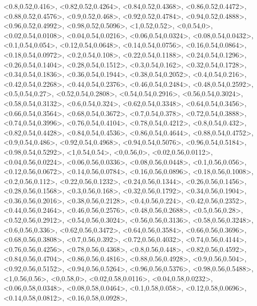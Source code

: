 \documentclass[a4paper,10pt]{article}
\begin{document}
\begin{eulernotebook}
\begin{euleroutput}
  <0.8,0.52,0.416>,
  <0.82,0.52,0.4264>,
  <0.84,0.52,0.4368>,
  <0.86,0.52,0.4472>,
  <0.88,0.52,0.4576>,
  <0.9,0.52,0.468>,
  <0.92,0.52,0.4784>,
  <0.94,0.52,0.4888>,
  <0.96,0.52,0.4992>,
  <0.98,0.52,0.5096>,
  <1,0.52,0.52>,
  <0,0.54,0>,
  <0.02,0.54,0.0108>,
  <0.04,0.54,0.0216>,
  <0.06,0.54,0.0324>,
  <0.08,0.54,0.0432>,
  <0.1,0.54,0.054>,
  <0.12,0.54,0.0648>,
  <0.14,0.54,0.0756>,
  <0.16,0.54,0.0864>,
  <0.18,0.54,0.0972>,
  <0.2,0.54,0.108>,
  <0.22,0.54,0.1188>,
  <0.24,0.54,0.1296>,
  <0.26,0.54,0.1404>,
  <0.28,0.54,0.1512>,
  <0.3,0.54,0.162>,
  <0.32,0.54,0.1728>,
  <0.34,0.54,0.1836>,
  <0.36,0.54,0.1944>,
  <0.38,0.54,0.2052>,
  <0.4,0.54,0.216>,
  <0.42,0.54,0.2268>,
  <0.44,0.54,0.2376>,
  <0.46,0.54,0.2484>,
  <0.48,0.54,0.2592>,
  <0.5,0.54,0.27>,
  <0.52,0.54,0.2808>,
  <0.54,0.54,0.2916>,
  <0.56,0.54,0.3024>,
  <0.58,0.54,0.3132>,
  <0.6,0.54,0.324>,
  <0.62,0.54,0.3348>,
  <0.64,0.54,0.3456>,
  <0.66,0.54,0.3564>,
  <0.68,0.54,0.3672>,
  <0.7,0.54,0.378>,
  <0.72,0.54,0.3888>,
  <0.74,0.54,0.3996>,
  <0.76,0.54,0.4104>,
  <0.78,0.54,0.4212>,
  <0.8,0.54,0.432>,
  <0.82,0.54,0.4428>,
  <0.84,0.54,0.4536>,
  <0.86,0.54,0.4644>,
  <0.88,0.54,0.4752>,
  <0.9,0.54,0.486>,
  <0.92,0.54,0.4968>,
  <0.94,0.54,0.5076>,
  <0.96,0.54,0.5184>,
  <0.98,0.54,0.5292>,
  <1,0.54,0.54>,
  <0,0.56,0>,
  <0.02,0.56,0.0112>,
  <0.04,0.56,0.0224>,
  <0.06,0.56,0.0336>,
  <0.08,0.56,0.0448>,
  <0.1,0.56,0.056>,
  <0.12,0.56,0.0672>,
  <0.14,0.56,0.0784>,
  <0.16,0.56,0.0896>,
  <0.18,0.56,0.1008>,
  <0.2,0.56,0.112>,
  <0.22,0.56,0.1232>,
  <0.24,0.56,0.1344>,
  <0.26,0.56,0.1456>,
  <0.28,0.56,0.1568>,
  <0.3,0.56,0.168>,
  <0.32,0.56,0.1792>,
  <0.34,0.56,0.1904>,
  <0.36,0.56,0.2016>,
  <0.38,0.56,0.2128>,
  <0.4,0.56,0.224>,
  <0.42,0.56,0.2352>,
  <0.44,0.56,0.2464>,
  <0.46,0.56,0.2576>,
  <0.48,0.56,0.2688>,
  <0.5,0.56,0.28>,
  <0.52,0.56,0.2912>,
  <0.54,0.56,0.3024>,
  <0.56,0.56,0.3136>,
  <0.58,0.56,0.3248>,
  <0.6,0.56,0.336>,
  <0.62,0.56,0.3472>,
  <0.64,0.56,0.3584>,
  <0.66,0.56,0.3696>,
  <0.68,0.56,0.3808>,
  <0.7,0.56,0.392>,
  <0.72,0.56,0.4032>,
  <0.74,0.56,0.4144>,
  <0.76,0.56,0.4256>,
  <0.78,0.56,0.4368>,
  <0.8,0.56,0.448>,
  <0.82,0.56,0.4592>,
  <0.84,0.56,0.4704>,
  <0.86,0.56,0.4816>,
  <0.88,0.56,0.4928>,
  <0.9,0.56,0.504>,
  <0.92,0.56,0.5152>,
  <0.94,0.56,0.5264>,
  <0.96,0.56,0.5376>,
  <0.98,0.56,0.5488>,
  <1,0.56,0.56>,
  <0,0.58,0>,
  <0.02,0.58,0.0116>,
  <0.04,0.58,0.0232>,
  <0.06,0.58,0.0348>,
  <0.08,0.58,0.0464>,
  <0.1,0.58,0.058>,
  <0.12,0.58,0.0696>,
  <0.14,0.58,0.0812>,
  <0.16,0.58,0.0928>,

\end{euleroutput}
\end{eulernotebook}
\end{document}
